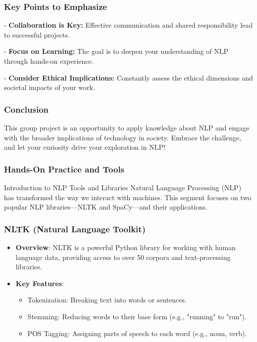 \documentclass{beamer}
\begin{document}
\begin{frame}
    \frametitle{Key Points to Emphasize}
    - \textbf{Collaboration is Key:} Effective communication and shared responsibility lead to successful projects.
    
    - \textbf{Focus on Learning:} The goal is to deepen your understanding of NLP through hands-on experience.
    
    - \textbf{Consider Ethical Implications:} Constantly assess the ethical dimensions and societal impacts of your work.
\end{frame}

\begin{frame}
    \frametitle{Conclusion}
    This group project is an opportunity to apply knowledge about NLP and engage with the broader implications of technology in society. Embrace the challenge, and let your curiosity drive your exploration in NLP!
\end{frame}

\begin{frame}[fragile]
    \frametitle{Hands-On Practice and Tools}
    \begin{block}{Introduction to NLP Tools and Libraries}
        Natural Language Processing (NLP) has transformed the way we interact with machines. This segment focuses on two popular NLP libraries—NLTK and SpaCy—and their applications.
    \end{block}
\end{frame}

\begin{frame}[fragile]
    \frametitle{NLTK (Natural Language Toolkit)}
    \begin{itemize}
        \item \textbf{Overview}: NLTK is a powerful Python library for working with human language data, providing access to over 50 corpora and text-processing libraries.
        \item \textbf{Key Features}:
        \begin{itemize}
            \item Tokenization: Breaking text into words or sentences.
            \item Stemming: Reducing words to their base form (e.g., "running" to "run").
            \item POS Tagging: Assigning parts of speech to each word (e.g., noun, verb).
        \end{itemize}
    \end{itemize}
\end{frame}
\end{document}
